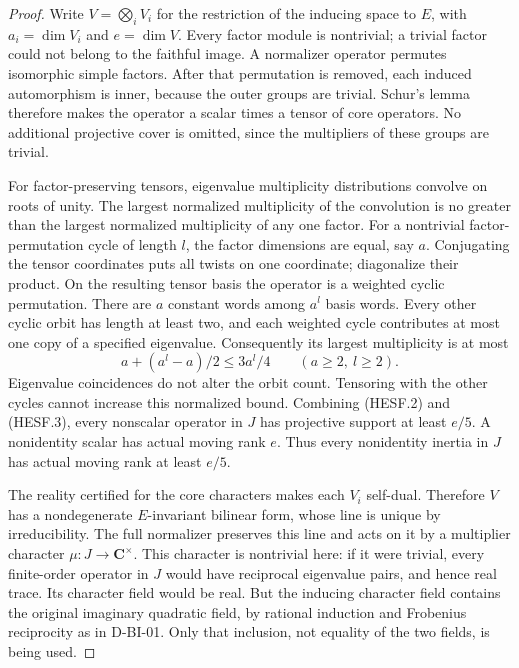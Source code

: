 \begin{proof}
Write $V=\bigotimes_iV_i$ for the restriction of the inducing space to
$E$, with $a_i=\dim V_i$ and $e=\dim V$. Every factor module is nontrivial;
a trivial factor could not belong to the faithful image. A normalizer
operator permutes isomorphic simple factors. After that permutation is
removed, each induced automorphism is inner, because the outer groups
are trivial. Schur's lemma therefore makes the operator a scalar times a
tensor of core operators. No additional projective cover is omitted,
since the multipliers of these groups are trivial.

For factor-preserving tensors, eigenvalue multiplicity distributions
convolve on roots of unity. The largest normalized multiplicity of the
convolution is no greater than the largest normalized multiplicity of any
one factor. For a nontrivial factor-permutation cycle of length $l$, the
factor dimensions are equal, say $a$. Conjugating the tensor coordinates
puts all twists on one coordinate; diagonalize their product. On the
resulting tensor basis the operator is a weighted cyclic permutation.
There are $a$ constant words among $a^l$ basis words. Every other cyclic
orbit has length at least two, and each weighted cycle contributes at
most one copy of a specified eigenvalue. Consequently its largest
multiplicity is at most
\[
           a+(a^l-a)/2\le 3a^l/4\qquad(a\ge2,\ l\ge2).
\tag{HESF.3}
\]
Eigenvalue coincidences do not alter the orbit count. Tensoring with the
other cycles cannot increase this normalized bound. Combining (HESF.2)
and (HESF.3), every nonscalar operator in $J$ has projective support at
least $e/5$. A nonidentity scalar has actual moving rank $e$. Thus every
nonidentity inertia in $J$ has actual moving rank at least $e/5$.

The reality certified for the core characters makes each $V_i$ self-dual.
Therefore $V$ has a nondegenerate $E$-invariant bilinear form, whose line
is unique by irreducibility. The full normalizer preserves this line and
acts on it by a multiplier character $\mu:J\to\mathbf C^\times$.
This character is nontrivial here: if it were trivial, every finite-order
operator in $J$ would have reciprocal eigenvalue pairs, and hence real
trace. Its character field would be real. But the inducing character
field contains the original imaginary quadratic field, by rational
induction and Frobenius reciprocity as in D-BI-01. Only that inclusion,
not equality of the two fields, is being used.


\end{proof}
